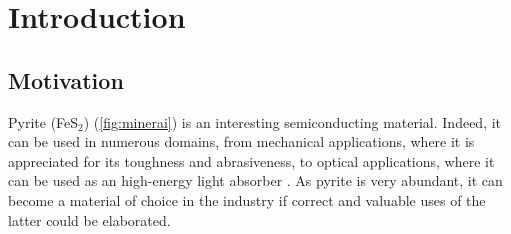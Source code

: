 \documentclass[11pt,a4paper]{article}
\makeatletter
\newcommand{\authors}{%
  \setlength\arrayrulewidth{2pt}
  \begin{tabular}{l|l}
  \@authorsi
}
\newcommand\@authorsi{\@ifnextchar\stopauthors{\@authorsend}{\@authorsii}}
\newcommand\@authorsii[2]{%
  \\
  \textbf{\Large #1} &  \textbf{\Large #2}
  \\
  \@authorsi %
}
\newcommand\@authorsend[1]{
  \end{tabular}}
\def \classSigle{LMAPR2451}
\def \className{Atomistic and nanoscopic simulations}
\def \workName{Study of FeS$_\text{2}$ and its optical properties}
\def \professors{Professors Jean-Christophe Charlier, Xavier Gonze \& Gian-Marco Rignanese\\Mentors : Alexandre Cloots \& Ionel-Bogdan Guster}
\def \academicYear{2020-2021}
\def \abstractText{This report aims to investigate the optical properties of FeS$_\text{2}$. To do so, \textit{ab initio} computations are first performed on a 6-atoms orthorhombic unit cell. The convergence with respect to several structural parameters is also studied. The optical properties are then analyzed in the light of the obtained results. Finally, a comparison is made with the published research, and a discussion about the quality of the simulation is made.}
\makeatother
\begin{document}
\tableofcontents
\newpage
\section{Introduction}
\subsection{Motivation}
Pyrite (FeS$_2$) (\autoref{fig:minerai}) is an interesting semiconducting material. Indeed, it can be used in numerous domains, from mechanical applications, where it is appreciated for its toughness and abrasiveness, to optical applications, where it can be used as an high-energy light absorber \cite{pyriteApps}. As pyrite is very abundant, it can become a material of choice in the industry if correct and valuable uses of the latter could be elaborated.
\end{document}
